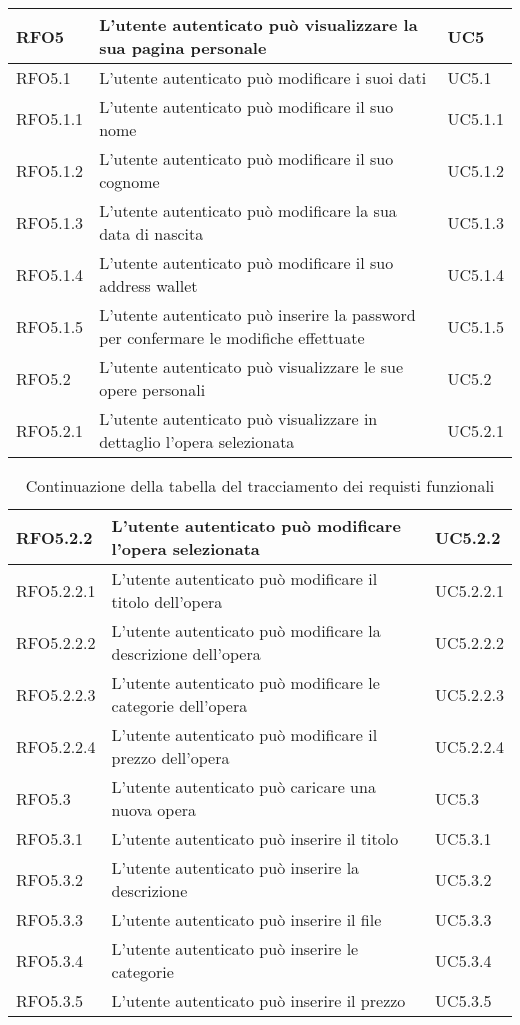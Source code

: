 \begin{table}[H]
\begin{tabularx}{\textwidth}{lXl}
\hline
RFO5 & L'utente autenticato può visualizzare la sua pagina personale & UC5 \\
\hline
RFO5.1 & L'utente autenticato può modificare i suoi dati & UC5.1 \\
\hline
RFO5.1.1 & L'utente autenticato può modificare il suo nome & UC5.1.1 \\
\hline
RFO5.1.2 & L'utente autenticato può modificare il suo cognome & UC5.1.2 \\
\hline
RFO5.1.3 & L'utente autenticato può modificare la sua data di nascita & UC5.1.3 \\
\hline
RFO5.1.4 & L'utente autenticato può modificare il suo address wallet & UC5.1.4 \\
\hline
RFO5.1.5 & L'utente autenticato può inserire la password per confermare le modifiche effettuate & UC5.1.5 \\
\hline
RFO5.2 & L'utente autenticato può visualizzare le sue opere personali & UC5.2 \\
\hline
RFO5.2.1 & L'utente autenticato può visualizzare in dettaglio l'opera selezionata  & UC5.2.1 \\
\hline
\end{tabularx}
\end{table}%

\begin{table}[H]
\caption{Continuazione della tabella del tracciamento dei requisti funzionali}
\label{tab:requisiti-funzionali1}
\renewcommand{\arraystretch}{1.6}
\begin{tabularx}{\textwidth}{lXl}
\hline\hline
RFO5.2.2 & L'utente autenticato può modificare l'opera selezionata & UC5.2.2 \\
\hline
RFO5.2.2.1 & L'utente autenticato può modificare il titolo dell'opera & UC5.2.2.1 \\
\hline
RFO5.2.2.2 & L'utente autenticato può modificare la descrizione dell'opera & UC5.2.2.2 \\
\hline
RFO5.2.2.3 & L'utente autenticato può modificare le categorie dell'opera & UC5.2.2.3 \\
\hline
RFO5.2.2.4 & L'utente autenticato può modificare il prezzo dell'opera & UC5.2.2.4 \\
\hline
RFO5.3 & L'utente autenticato può caricare una nuova opera & UC5.3 \\
\hline
RFO5.3.1 & L'utente autenticato può inserire il titolo & UC5.3.1 \\
\hline
RFO5.3.2 & L'utente autenticato può inserire la descrizione & UC5.3.2 \\
\hline
RFO5.3.3 & L'utente autenticato può inserire il file & UC5.3.3 \\
\hline
RFO5.3.4 & L'utente autenticato può inserire le categorie & UC5.3.4 \\
\hline
RFO5.3.5 & L'utente autenticato può inserire il prezzo & UC5.3.5 \\
\hline
\end{tabularx}
\end{table}%


